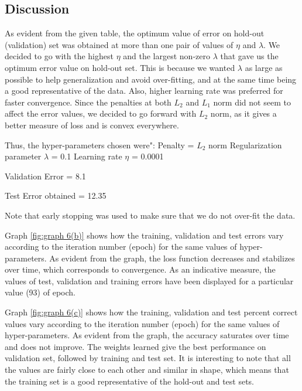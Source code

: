 \documentclass{article}
\begin{document}
\subsection{Discussion}

As evident from the given table, the optimum value of error on hold-out (validation) set was obtained at more than one pair of values of $\eta$ and $\lambda$. We decided to go with the highest $\eta$ and the largest non-zero $\lambda$ that gave us the optimum error value on hold-out set. This is because we wanted $\lambda$ as large as possible to help generalization and avoid over-fitting, and at the same time being a good representative of the data. Also, higher learning rate was preferred for faster convergence. Since the penalties at both $L_{2}$ and $L_{1}$ norm did not seem to affect the error values, we decided to go forward with $L_{2}$ norm, as it gives a better measure of loss and is convex everywhere.

Thus, the hyper-parameters chosen were":
Penalty = $L_{2}$ norm
Regularization parameter $\lambda$ = 0.1
Learning rate $\eta$ = 0.0001

Validation Error = 8.1%

Test Error obtained = 12.35%

Note that early stopping was used to make sure that we do not over-fit the data.
 
Graph \ref{fig:graph 6(b)} shows how the training, validation and test errors vary according to the iteration number (epoch) for the same values of hyper-parameters. As evident from the graph, the loss function decreases and stabilizes over time, which corresponds to convergence. As an indicative measure, the values of test, validation and training errors have been displayed for a particular value (93) of epoch.

Graph \ref{fig:graph 6(c)} shows how the training, validation and test percent correct values vary according to the iteration number (epoch) for the same values of hyper-parameters. As evident from the graph, the accuracy saturates over time and does not improve. The weights learned give the best performance on validation set, followed by training and test set. It is interesting to note that all the values are fairly close to each other and similar in shape, which means that the training set is a good representative of the hold-out and test sets.


\newpage
\end{document}
